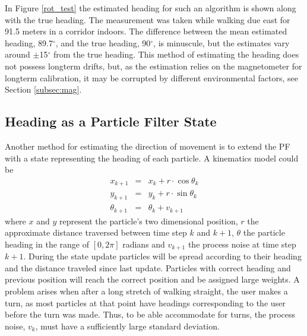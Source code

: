 \documentclass{LTHthesis}
\begin{document}
In Figure \ref{rot_test} the estimated heading for such an algorithm is shown along with the true heading. The measurement was taken while walking due east for 91.5 meters in a corridor indoors. The difference between the mean estimated heading, 89.7$^\circ$, and the true heading, 90$^\circ$, is minuscule, but the estimates vary around $\pm$15$^\circ$ from the true heading. This method of estimating the heading does not possess longterm drifts, but, as the estimation relies on the magnetometer for longterm calibration, it may be corrupted by different environmental factors, see Section \ref{subsec:mag}. 
%
\subsection{Heading as a Particle Filter State}
\label{subsec:PF_heading}
%
Another method for estimating the direction of movement is to extend the PF with a state representing the heading of each particle. A kinematics model could be
%
\begin{eqnarray}
x_{k+1} &  = & x_k + r\cdot\cos{\theta_k} \nonumber\\
y_{k+1} & = &y_k + r\cdot\sin{\theta_k}\label{eq:heading_kin_mod}\\
\theta_{k+1} & = & \theta_k + v_{k+1} \nonumber
\end{eqnarray}
%
where $x$ and $y$ represent the particle's two dimensional position, $r$ the approximate distance traversed between time step $k$ and $k+1$, $\theta$ the particle heading in the range of $\left[0,2\pi\right]$ radians and $v_{k+1}$ the process noise at time step $k+1$. During the state update particles will be spread according to their heading and the distance traveled since last update. Particles with correct heading and previous position will reach the correct position and be assigned large weights. A problem arises when after a long stretch of walking straight, the user makes a turn, as most particles at that point have headings corresponding to the user before the turn was made. Thus, to be able accommodate for turns, the process noise, $v_k$, must have a sufficiently large standard deviation. 
\end{document}
